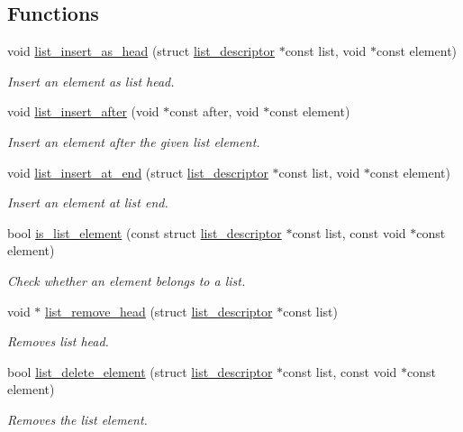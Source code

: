 \subsection*{Functions}
\begin{DoxyCompactItemize}
\item 
void \hyperlink{group__doc__driver__hal__utils__list_gafb3237f00dbf55a40075f3a42c49d32a}{list\+\_\+insert\+\_\+as\+\_\+head} (struct \hyperlink{structlist__descriptor}{list\+\_\+descriptor} $\ast$const list, void $\ast$const element)
\begin{DoxyCompactList}\small\item\em Insert an element as list head. \end{DoxyCompactList}\item 
void \hyperlink{group__doc__driver__hal__utils__list_ga55b8c083fa131f829b1c998e14352f34}{list\+\_\+insert\+\_\+after} (void $\ast$const after, void $\ast$const element)
\begin{DoxyCompactList}\small\item\em Insert an element after the given list element. \end{DoxyCompactList}\item 
void \hyperlink{group__doc__driver__hal__utils__list_ga48c5a1a13223944dd190a6a028075deb}{list\+\_\+insert\+\_\+at\+\_\+end} (struct \hyperlink{structlist__descriptor}{list\+\_\+descriptor} $\ast$const list, void $\ast$const element)
\begin{DoxyCompactList}\small\item\em Insert an element at list end. \end{DoxyCompactList}\item 
bool \hyperlink{group__doc__driver__hal__utils__list_ga26022c1362f0fa7e17b734262229c1a7}{is\+\_\+list\+\_\+element} (const struct \hyperlink{structlist__descriptor}{list\+\_\+descriptor} $\ast$const list, const void $\ast$const element)
\begin{DoxyCompactList}\small\item\em Check whether an element belongs to a list. \end{DoxyCompactList}\item 
void $\ast$ \hyperlink{group__doc__driver__hal__utils__list_ga2269db44f7013963f60c568dd8d08022}{list\+\_\+remove\+\_\+head} (struct \hyperlink{structlist__descriptor}{list\+\_\+descriptor} $\ast$const list)
\begin{DoxyCompactList}\small\item\em Removes list head. \end{DoxyCompactList}\item 
bool \hyperlink{group__doc__driver__hal__utils__list_gad5a2a1ff5dcdfadb47d4ba436e154c98}{list\+\_\+delete\+\_\+element} (struct \hyperlink{structlist__descriptor}{list\+\_\+descriptor} $\ast$const list, const void $\ast$const element)
\begin{DoxyCompactList}\small\item\em Removes the list element. \end{DoxyCompactList}\end{DoxyCompactItemize}


